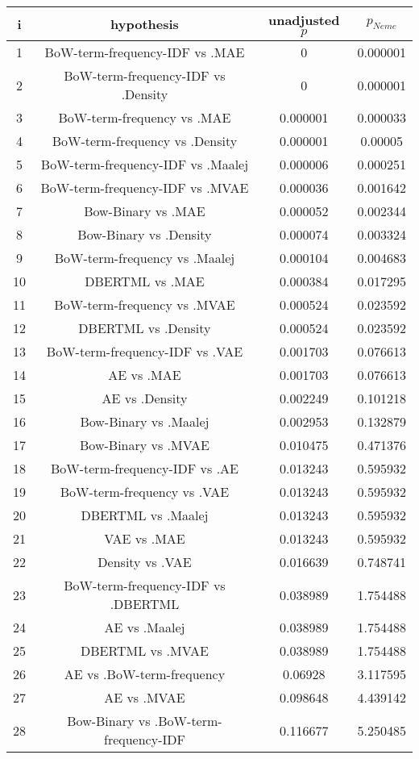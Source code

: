 \documentclass[a4paper,10pt]{article}
\begin{document}
\begin{landscape}
\begin{table}[!htp]
\centering\scriptsize
\begin{tabular}{cccc}
i&hypothesis&unadjusted $p$&$p_{Neme}$\\
\hline1&BoW-term-frequency-IDF vs .MAE&0&0.000001\\
2&BoW-term-frequency-IDF vs .Density&0&0.000001\\
3&BoW-term-frequency vs .MAE&0.000001&0.000033\\
4&BoW-term-frequency vs .Density&0.000001&0.00005\\
5&BoW-term-frequency-IDF vs .Maalej&0.000006&0.000251\\
6&BoW-term-frequency-IDF vs .MVAE&0.000036&0.001642\\
7&Bow-Binary vs .MAE&0.000052&0.002344\\
8&Bow-Binary vs .Density&0.000074&0.003324\\
9&BoW-term-frequency vs .Maalej&0.000104&0.004683\\
10&DBERTML vs .MAE&0.000384&0.017295\\
11&BoW-term-frequency vs .MVAE&0.000524&0.023592\\
12&DBERTML vs .Density&0.000524&0.023592\\
13&BoW-term-frequency-IDF vs .VAE&0.001703&0.076613\\
14&AE vs .MAE&0.001703&0.076613\\
15&AE vs .Density&0.002249&0.101218\\
16&Bow-Binary vs .Maalej&0.002953&0.132879\\
17&Bow-Binary vs .MVAE&0.010475&0.471376\\
18&BoW-term-frequency-IDF vs .AE&0.013243&0.595932\\
19&BoW-term-frequency vs .VAE&0.013243&0.595932\\
20&DBERTML vs .Maalej&0.013243&0.595932\\
21&VAE vs .MAE&0.013243&0.595932\\
22&Density vs .VAE&0.016639&0.748741\\
23&BoW-term-frequency-IDF vs .DBERTML&0.038989&1.754488\\
24&AE vs .Maalej&0.038989&1.754488\\
25&DBERTML vs .MVAE&0.038989&1.754488\\
26&AE vs .BoW-term-frequency&0.06928&3.117595\\
27&AE vs .MVAE&0.098648&4.439142\\
28&Bow-Binary vs .BoW-term-frequency-IDF&0.116677&5.250485\\

\end{tabular}
\end{table}
\end{landscape}
\end{document}
